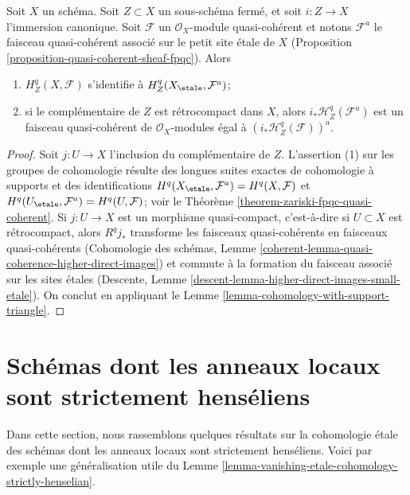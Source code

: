 \begin{lemma}
\label{lemma-cohomology-with-support-quasi-coherent}
Soit $X$ un schéma. Soit $Z \subset X$ un sous-schéma fermé, et soit $i : Z \to X$ l'immersion canonique.
Soit $\mathcal{F}$ un $\mathcal{O}_X$-module quasi-cohérent
et notons $\mathcal{F}^a$ le faisceau quasi-cohérent associé
sur le petit site étale de $X$
(Proposition \ref{proposition-quasi-coherent-sheaf-fpqc}). Alors
\begin{enumerate}
\item $H^q_Z(X, \mathcal{F})$ s'identifie à $H^q_Z(X_\etale, \mathcal{F}^a)$;
\item si le complémentaire de $Z$ est rétrocompact dans $X$, alors
$i_*\mathcal{H}^q_Z(\mathcal{F}^a)$ est un faisceau quasi-cohérent de
$\mathcal{O}_X$-modules égal à $(i_*\mathcal{H}^q_Z(\mathcal{F}))^a$.
\end{enumerate}
\end{lemma}

\begin{proof}
Soit $j : U \to X$ l'inclusion du complémentaire de $Z$.
L'assertion (1) sur les groupes de cohomologie résulte des longues
suites exactes de cohomologie à supports et des identifications
$H^q(X_\etale, \mathcal{F}^a) = H^q(X, \mathcal{F})$ et
$H^q(U_\etale, \mathcal{F}^a) = H^q(U, \mathcal{F})$; voir le
Théorème \ref{theorem-zariski-fpqc-quasi-coherent}.
Si $j : U \to X$ est un morphisme quasi-compact, c'est-à-dire si $U \subset X$
est rétrocompact, alors $R^qj_*$ transforme les faisceaux quasi-cohérents
en faisceaux quasi-cohérents
(Cohomologie des schémas, Lemme
\ref{coherent-lemma-quasi-coherence-higher-direct-images})
et commute à la formation du
faisceau associé sur les sites étales
(Descente, Lemme \ref{descent-lemma-higher-direct-images-small-etale}).
On conclut en appliquant le
Lemme \ref{lemma-cohomology-with-support-triangle}.
\end{proof}







\section{Schémas dont les anneaux locaux sont strictement henséliens}
\label{section-strictly-henselian-local-rings}

\noindent
Dans cette section, nous rassemblons quelques résultats sur la cohomologie étale
des schémas dont les anneaux locaux sont strictement henséliens. Voici par exemple
une généralisation utile du
Lemme \ref{lemma-vanishing-etale-cohomology-strictly-henselian}.


